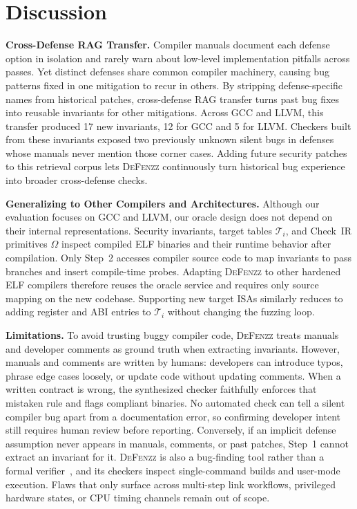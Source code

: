 \documentclass[conference,compsoc]{IEEEtran}
\begin{document}
\section{Discussion}\label{sec:discussion}

\noindent\textbf{Cross-Defense RAG Transfer.}
Compiler manuals document each defense option in isolation and rarely warn about low-level implementation pitfalls across passes. Yet distinct defenses share common compiler machinery, causing bug patterns fixed in one mitigation to recur in others. By stripping defense-specific names from historical patches, cross-defense RAG transfer turns past bug fixes into reusable invariants for other mitigations. Across GCC and LLVM, this transfer produced 17 new invariants, 12 for GCC and 5 for LLVM. Checkers built from these invariants exposed two previously unknown silent bugs in defenses whose manuals never mention those corner cases. Adding future security patches to this retrieval corpus lets \textsc{DeFenzz} continuously turn historical bug experience into broader cross-defense checks.

\medskip\noindent\textbf{Generalizing to Other Compilers and Architectures.}
Although our evaluation focuses on GCC and LLVM, our oracle design does not depend on their internal representations. Security invariants, target tables $\mathcal{T}_i$, and Check~IR primitives $\Omega$ inspect compiled ELF binaries and their runtime behavior after compilation. Only Step~2 accesses compiler source code to map invariants to pass branches and insert compile-time probes. Adapting \textsc{DeFenzz} to other hardened ELF compilers therefore reuses the oracle service and requires only source mapping on the new codebase. Supporting new target ISAs similarly reduces to adding register and ABI entries to $\mathcal{T}_i$ without changing the fuzzing loop.

\medskip\noindent\textbf{Limitations.}
To avoid trusting buggy compiler code, \textsc{DeFenzz} treats manuals and developer comments as ground truth when extracting invariants. However, manuals and comments are written by humans: developers can introduce typos, phrase edge cases loosely, or update code without updating comments. When a written contract is wrong, the synthesized checker faithfully enforces that mistaken rule and flags compliant binaries. No automated check can tell a silent compiler bug apart from a documentation error, so confirming developer intent still requires human review before reporting. Conversely, if an implicit defense assumption never appears in manuals, comments, or past patches, Step~1 cannot extract an invariant for it. \textsc{DeFenzz} is also a bug-finding tool rather than a formal verifier~\cite{leroy2009compcert,lopes2021alive2}, and its checkers inspect single-command builds and user-mode execution. Flaws that only surface across multi-step link workflows, privileged hardware states, or CPU timing channels remain out of scope.
\end{document}
